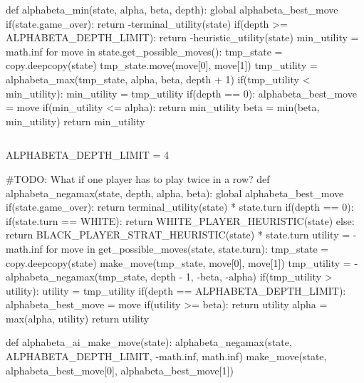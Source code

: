 def alphabeta\_min(state, alpha, beta, depth): global
alphabeta\_best\_move if(state.game\_over): return
-terminal\_utility(state) if(depth \textgreater=
ALPHABETA\_DEPTH\_LIMIT): return -heuristic\_utility(state) min\_utility
= math.inf for move in state.get\_possible\_moves(): tmp\_state =
copy.deepcopy(state) tmp\_state.move(move{[}0{]}, move{[}1{]})
tmp\_utility = alphabeta\_max(tmp\_state, alpha, beta, depth + 1)
if(tmp\_utility \textless{} min\_utility): min\_utility = tmp\_utility
if(depth == 0): alphabeta\_best\_move = move if(min\_utility \textless=
alpha): return min\_utility beta = min(beta, min\_utility) return
min\_utility

\begin{lstlisting}[language=Python]
\end{lstlisting}

ALPHABETA\_DEPTH\_LIMIT = 4

\#TODO: What if one player has to play twice in a row? def
alphabeta\_negamax(state, depth, alpha, beta): global
alphabeta\_best\_move if(state.game\_over): return
terminal\_utility(state) * state.turn if(depth == 0): if(state.turn ==
WHITE): return WHITE\_PLAYER\_HEURISTIC(state) else: return
BLACK\_PLAYER\_STRAT\_HEURISTIC(state) * state.turn utility = -math.inf
for move in get\_possible\_moves(state, state.turn): tmp\_state =
copy.deepcopy(state) make\_move(tmp\_state, move{[}0{]}, move{[}1{]})
tmp\_utility = -alphabeta\_negamax(tmp\_state, depth - 1, -beta, -alpha)
if(tmp\_utility \textgreater{} utility): utility = tmp\_utility if(depth
== ALPHABETA\_DEPTH\_LIMIT): alphabeta\_best\_move = move if(utility
\textgreater= beta): return utility alpha = max(alpha, utility) return
utility

def alphabeta\_ai\_make\_move(state): alphabeta\_negamax(state,
ALPHABETA\_DEPTH\_LIMIT, -math.inf, math.inf) make\_move(state,
alphabeta\_best\_move{[}0{]}, alphabeta\_best\_move{[}1{]})
